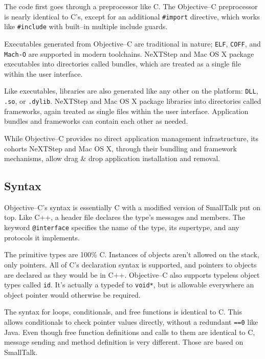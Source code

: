 	The code first goes through a preprocessor like C.  The Objective--C preprocessor is nearly identical to C's, except for an additional \texttt{\#import} directive, which works like \texttt{\#include} with built--in multiple include guards.

	Ex\-ec\-ut\-abl\-es generated from Obj\-ect\-ive--C are traditional in nature; \texttt{ELF}, \texttt{COFF}, and \texttt{Mach-O} are supported in modern toolchains.  NeXTStep and Mac OS X package executables into directories called bundles, which are treated as a single file within the user interface.

	Like executables, libraries are also generated like any other on the platform: \texttt{DLL}, \texttt{.so}, or \texttt{.dylib}.  NeXTStep and Mac OS X package libraries into directories called frameworks, again treated as single files within the user interface.  Application bundles and frameworks can contain each other as needed.

	While Objective--C provides no direct application management infrastructure, its cohorts NeXTStep and Mac OS X, through their bundling and framework mechanisms, allow drag \& drop application installation and removal.

\subsection{Syntax}
	Objective--C's syntax is essentially C with a modified version of SmallTalk put on top.  Like C++, a header file declares the type's messages and members.  The keyword \texttt{@interface} specifies the name of the type, its supertype, and any protocols it implements.

	The primitive types are 100\% C.  Instances of objects aren't allowed on the stack, only pointers.  All of C's declaration syntax is supported, and pointers to objects are declared as they would be in C++.  Objective--C also supports typeless object types called \texttt{id}.  It's actually a typedef to \texttt{void*}, but is allowable everywhere an object pointer would otherwise be required.

	The syntax for loops, conditionals, and free functions is identical to C.  This allows conditionals to check pointer values directly, without a redundant \texttt{==0} like Java.  Even though free function definitions and calls to them are identical to C, message sending and method definition is very different.  Those are based on SmallTalk.


